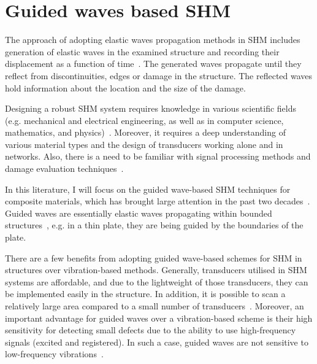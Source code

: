 \section[Guided waves based SHM]{Guided waves based SHM}
\label{sec22}
The approach of adopting elastic waves propagation methods in SHM includes generation of elastic waves in the examined structure and recording their displacement as a function of time~\cite{Ostachowicz2012}. 
The generated waves propagate until they reflect from discontinuities, edges or damage in the structure. The reflected waves hold information about the location and the size of the damage.  

Designing a robust SHM system requires knowledge in various scientific fields (e.g. mechanical and electrical engineering, as well as in computer science, mathematics, and physics)~\cite{Willberg2013}.
Moreover, it requires a deep understanding of various material types and the design of transducers working alone and in networks. 
Also, there is a need to be familiar with signal processing methods and damage evaluation techniques~\cite{Willberg2013}.

In this literature, I will focus on the guided wave-based SHM techniques for composite materials, which has brought large attention in the past two decades~\cite{Mitra2016}.
Guided waves are essentially elastic waves propagating within bounded 
structures~\cite{Mitra2016}, e.g. in a thin plate, they are being guided by the boundaries of the plate. 

There are a few benefits from adopting guided wave-based schemes for SHM in structures over vibration-based methods. 
Generally, transducers utilised in SHM systems are affordable, and due to the lightweight of those transducers, they can be implemented easily in the structure.
In addition, it is possible to scan a relatively large area compared to a small number of transducers~\cite{Mitra2016}. 
Moreover, an important advantage for guided waves over a vibration-based scheme is their high sensitivity for detecting small defects due to the ability to use high-frequency signals (excited and registered).
In such a case, guided waves are not sensitive to low-frequency vibrations~\cite{Mitra2016,Croxford2007}.

